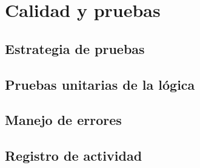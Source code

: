 \chapter{Calidad y pruebas}
\label{cap:pruebas}

\section{Estrategia de pruebas}

\section{Pruebas unitarias de la lógica}

\section{Manejo de errores}

\section{Registro de actividad}
